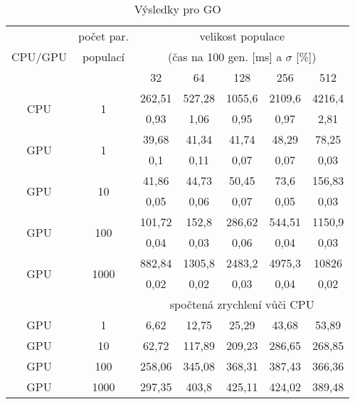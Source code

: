 \begin{table}[c]
    \begin{center}
    \begin{tabular}{ccccccc}
      \toprule
      \midrule
      \multirow{3}{*}{CPU/GPU} & počet par. & \multicolumn{5}{c}{velikost populace} \\
      & populací & \multicolumn{5}{c}{(čas na 100 gen. [ms] a $\sigma$ [\%])} \\
      & & 32 & 64 & 128 & 256 & 512 \\
      \midrule
      \multirow{2}{*}{CPU} & \multirow{2}{*}{1}
&262,51&527,28&1055,6&2109,6&4216,4\\
&&0,93&1,06&0,95&0,97&2,81\vspace{1.5mm}\\
\multirow{2}{*}{GPU} & \multirow{2}{*}{1}
&39,68&41,34&41,74&48,29&78,25\\
&&0,1&0,11&0,07&0,07&0,03\vspace{1.5mm}\\
\multirow{2}{*}{GPU} & \multirow{2}{*}{10}
&41,86&44,73&50,45&73,6&156,83\\
&&0,05&0,06&0,07&0,05&0,03\vspace{1.5mm}\\
\multirow{2}{*}{GPU} & \multirow{2}{*}{100}
&101,72&152,8&286,62&544,51&1150,9\\
&&0,04&0,03&0,06&0,04&0,03\vspace{1.5mm}\\
\multirow{2}{*}{GPU} & \multirow{2}{*}{1000}
&882,84&1305,8&2483,2&4975,3&10826\\
&&0,02&0,02&0,03&0,04&0,02\\
\midrule
      & & \multicolumn{5}{c}{spočtená zrychlení vůči CPU} \\
\midrule
      GPU & 1
&6,62&12,75&25,29&43,68&53,89\\
GPU & 10
&62,72&117,89&209,23&286,65&268,85\\
GPU & 100
&258,06&345,08&368,31&387,43&366,36\\
GPU & 1000
&297,35&403,8&425,11&424,02&389,48\\
\midrule
      \bottomrule
    \end{tabular}
    \caption{Výsledky pro GO}
    \end{center}
\end{table}
\nopagebreak
